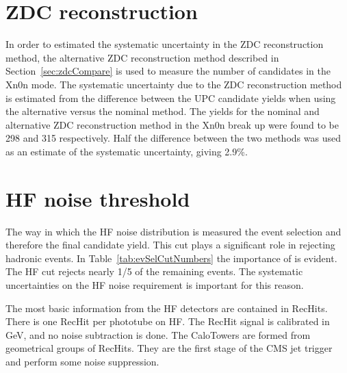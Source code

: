   \section{ZDC reconstruction}
    In order to estimated the systematic uncertainty in the ZDC reconstruction
      method, the alternative ZDC reconstruction method described in 
      Section~\ref{sec:zdcCompare} is used to measure the number of candidates
      in the Xn0n mode.
    The systematic uncertainty due to the ZDC reconstruction method is
      estimated from the difference between the UPC \JPsi{} candidate yields 
      when using the alternative versus the nominal method.
    The yields for the nominal and alternative ZDC reconstruction method in the 
      Xn0n break up were found to be 298 and 315 respectively. 
    Half the difference between the two methods was used as an estimate of 
      the systematic uncertainty, giving 2.9\%.

  \section{HF noise threshold}
    The way in which the HF noise distribution is measured \DIFdelbegin {}\DIFdelend \DIFaddbegin {}\DIFaddend the event 
      selection and therefore the final candidate yield.
    This cut plays a significant role in rejecting hadronic events.
    In Table~\ref{tab:evSelCutNumbers} the importance of \DIFdelbegin {}\DIFdelend \DIFaddbegin {}\DIFaddend is evident. 
    The HF \DIFdelbegin {}\DIFdelend \DIFaddbegin {}\DIFaddend cut rejects nearly 1/5 of the remaining events. 
    The systematic uncertainties on the HF noise requirement is important for
      this reason.

    The most basic information from the HF detectors are contained in RecHits. 
    There is one RecHit per phototube on HF. 
    The RecHit signal is calibrated in GeV, and no noise subtraction is done. 
    The CaloTowers are formed from geometrical groups of RecHits. 
    They are the first stage of the CMS jet trigger and perform some noise 
      suppression.

